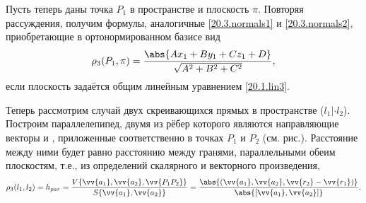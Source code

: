   Пусть теперь даны точка $P_1$ в пространстве и плоскость $\pi$. Повторяя рассуждения, получим формулы, аналогичные \ref{20.3.normals1} и \ref{20.3.normals2}, приобретающие в ортонормированном базисе вид
  \begin{equation}
  \rho_3 (P_1,\pi) = \dfrac{\abs{Ax_1+By_1+Cz_1+D}}{\sqrt{A^2+B^2+C^2}},
  \end{equation}
  если плоскость задаётся общим линейным уравнением \ref{20.1.lin3}.

  Теперь рассмотрим случай двух скреивающихся прямых в пространстве ($l_1|\cdot l_2$). Построим параллелепипед, двумя из рёбер которого являются направляющие векторы  и , приложенные соответственно в точках $P_1$ и $P_2$ (см. рис.). Расстояние между ними будет равно расстоянию между гранями, параллельными обеим плоскостям, т.е., из определений скалярного и векторного произведения,
  \begin{equation}
  \rho_3(l_1,l_2)=h_{par}=\dfrac{V \lbrace \vv{a_1},\vv{a_2},\vv{P_1P_2} \rbrace}{S \lbrace \vv{a_1},\vv{a_2} \rbrace}=\dfrac{\abs{(\vv{a_1},\vv{a_2},\vv{r_2}-\vv{r_1})}}{\abs{[\vv{a_1},\vv{a_2}]}}.
  \end{equation}   
\label{ch20pict3}